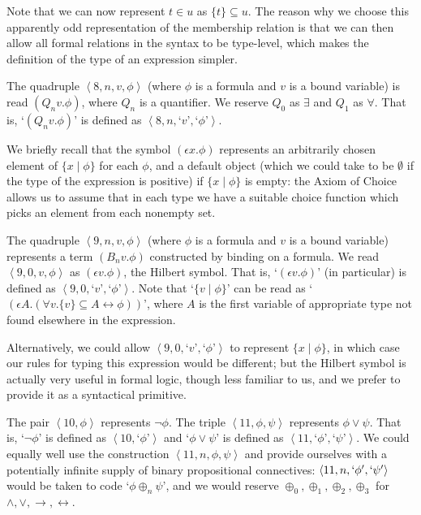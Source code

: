 \documentclass[12pt]{book}
\begin{document}
Note that we can
now represent $t \in u$ as $\{t\} \subseteq u$.  The reason why we choose this apparently odd representation of the membership
relation is that we can then allow all formal relations in the syntax to be type-level, which makes the definition of
the type of an expression simpler.

The quadruple $\left<8,n,v,\phi\right>$ (where $\phi$ is a formula and
$v$ is a bound variable) is read $(Q_nv.\phi)$, where $Q_n$ is a quantifier.
We reserve $Q_0$ as $\exists$ and $Q_1$ as $\forall$.  That is, `$(Q_nv.\phi)$' is defined as $\left<8,n,\right.$`$v$'$,$`$\phi$'$\left.\right>$.

We briefly recall that the symbol $(\epsilon x.\phi)$ represents an arbitrarily chosen element of $\{x \mid \phi\}$ for each $\phi$, and a default object (which we could take to be $\emptyset$ if the type of the expression is positive) if $\{x \mid \phi\}$ is empty:  the Axiom of Choice allows us to assume
that in each type we have a suitable choice function which picks an element from each nonempty set.

The quadruple $\left<9,n,v,\phi\right>$ (where $\phi$ is a formula and
$v$ is a bound variable) represents a term $(B_nv.\phi)$ constructed by binding on a
formula.  We read $\left<9,0,v,\phi\right>$ as $(\epsilon v.\phi)$,
the Hilbert symbol.    That is, `$(\epsilon v.\phi)$'
(in particular) is defined as $\left<9,0,\right.$`$v$'$,$`$\phi$'$\left.\right>$.   Note that `$\{v \mid \phi\}$' can be read as
`$(\epsilon A.(\forall v.\{v\} \subseteq A \leftrightarrow \phi))$', where $A$ is the first variable of appropriate type not found elsewhere in the expression.

Alternatively, we could allow
$\left<9,0,\right.$`$v$'$,$`$\phi$'$\left.\right>$ to represent $\{x \mid \phi\}$, in which case our rules for typing this expression would be different; but the Hilbert symbol is actually very useful in formal logic, though less familiar to us, and we prefer to provide it as a syntactical primitive.

The pair $\left<10,\phi\right>$ represents $\neg \phi$.  The triple
$\left<11,\phi,\psi\right>$ represents $\phi \vee \psi$.  That is,
`$\neg \phi$' is defined as $\left<10,\right.$`$\phi$'$\left.\right>$ and `$\phi \vee \psi$'
is defined as $\left<11,\right.$`$\phi$'$,$`$\psi$'$\left.\right>$.  We could equally
well use the construction $\left<11,n,\phi,\psi\right>$ and provide ourselves with
a potentially infinite supply of binary propositional connectives:  $\left<11,n,`\phi',`\psi'\right>$ would be taken to code
`$\phi \oplus_n \psi$', and we would reserve $\oplus_0, \oplus_1, \oplus_2,\oplus_3$ for $\wedge,\vee,\rightarrow,\leftrightarrow$.
\end{document}
